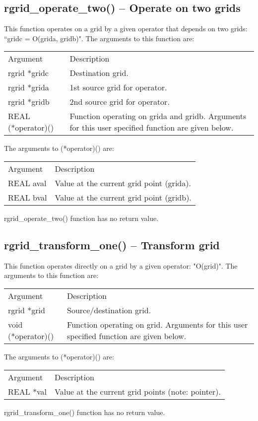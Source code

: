 \documentclass[12pt,letterpaper]{report}
\begin{document}
\subsection{rgrid\_operate\_two() -- Operate on two grids}

This function  operates on a grid by a given operator that depends on two grids: ``gridc = O(grida, gridb)". The arguments to this function are:
\begin{longtable}{p{} p{}}
Argument & Description\\
\cline{1-2}
rgrid *gridc & Destination grid.\\
rgrid *grida & 1st source grid for operator.\\
rgrid *gridb & 2nd source grid for operator.\\
REAL (*operator)() & Function operating on grida and gridb. Arguments for this user specified function are given below.\\
\end{longtable}
The arguments to (*operator)() are:
\begin{longtable}{p{} p{}}
Argument & Description\\
\cline{1-2}
REAL aval & Value at the current grid point (grida).\\
REAL bval & Value at the current grid point (gridb).\\
\end{longtable}
\noindent
rgrid\_operate\_two() function has no return value.

\subsection{rgrid\_transform\_one() -- Transform grid}

This function operates directly on a grid by a given operator:  "O(grid)". The arguments to this function are:
\begin{longtable}{p{} p{}}
Argument & Description\\
\cline{1-2}
rgrid *grid & Source/destination grid.\\
void (*operator)() & Function operating on grid. Arguments for this user specified function are given below.\\
\end{longtable}
The arguments to (*operator)() are:
\begin{longtable}{p{} p{}}
Argument & Description\\
\cline{1-2}
REAL *val & Value at the current grid points (note: pointer).\\
\end{longtable}
\noindent
rgrid\_transform\_one() function has no return value.
\end{document}
